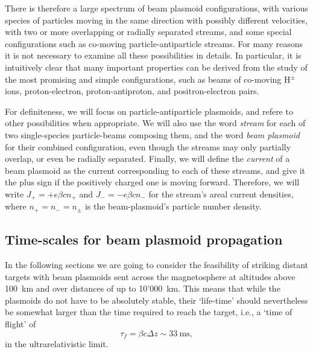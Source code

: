 \documentclass [12pt,a4paper,     ]{report} %
\begin{document}
   There is therefore a large spectrum of beam plasmoid configurations, with various species of particles moving in the same direction with possibly different velocities, with two or more overlapping or radially separated streams, and some special configurations such as co-moving particle-antiparticle streams.  For many reasons it is not necessary to examine all these possibilities in details.  In particular, it is intuitively clear that many important properties can be derived from the study of the most promising and simple configurations, such as beams of co-moving H$^\pm$ ions, proton-electron, proton-antiproton, and positron-electron pairs.

   For definiteness, we will focus on particle-antiparticle plasmoids, and refere to other possibilities when appropriate.  We will also use the word \emph{stream} for each of two single-species particle-beams composing them, and the word \emph{beam plasmoid} for their combined configuration, even though the streams may only partially overlap, or even be radially separated.  Finally, we will define the \emph{current} of a beam plasmoid as the current corresponding to each of these streams, and give it the plus sign if the positively charged one is moving forward. Therefore, we will write $J_+ = +e\beta c n_+$ and  $J_- = -e\beta c n_-$ for the stream's areal current densities, where $n_+=n_-=n_\pm$ is the beam-plasmoid's particle number density.
  

\subsection{Time-scales for beam plasmoid propagation}

In the following sections we are going to consider the feasibility of striking distant targets with beam plasmoids sent across the magnetosphere at altitudes above 100~km and over distances of up to 10'000~km.  This means that while the plasmoids do not have to be absolutely stable, their `life-time' should nevertheless be somewhat larger than the time required to reach the target, i.e., a `time of flight' of
%
\begin{equation}\label{pfa:5} 
        \tau_f = \beta c \Delta z \sim 33 ~\text{ms},
\end{equation}
%
in the ultrarelativistic limit.
\end{document}
